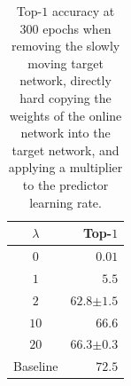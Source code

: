 \begin{table}[ht]
\centering \small
\begin{tabular}{cr}
\toprule
   $\lambda$ & Top-$1$   \\
\midrule
$0$ & $0.01$  \\
                         $1$ & $5.5$  \\
                         $2$ & $62.8 {\scriptstyle \pm 1.5}$ \\
                        $10$ & $66.6$  \\
                        $20$ & $66.3 {\scriptstyle \pm 0.3}$ \\
\midrule
Baseline & $72.5$ \\
\bottomrule
\end{tabular}\vspace{0.25cm}
\captionsetup{width=.9\linewidth}
\caption{Top-$1$ accuracy at 300 epochs when removing the slowly moving target network, directly hard copying the weights of the online network into the target network, and applying a multiplier to the predictor learning rate.}
\label{tab:pred_lr}
\end{table}

